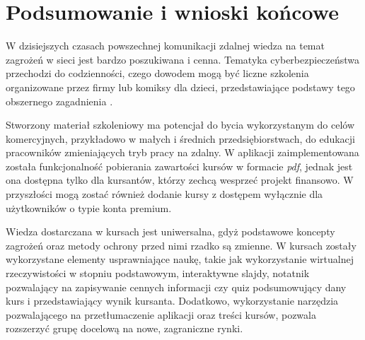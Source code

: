 \documentclass[12pt,twoside]{article}
\begin{document}
\section{Podsumowanie i wnioski końcowe}

W dzisiejszych czasach powszechnej komunikacji zdalnej wiedza na temat zagrożeń w sieci jest bardzo poszukiwana i cenna. Tematyka cyberbezpieczeństwa przechodzi do codzienności, czego dowodem mogą być liczne szkolenia organizowane przez firmy lub komiksy dla dzieci, przedstawiające podstawy tego obszernego zagadnienia \cite{Edukomiks}.


Stworzony materiał szkoleniowy ma potencjał do bycia wykorzystanym do celów komercyjnych, przykładowo w małych i średnich przedsiębiorstwach, do edukacji pracowników zmieniających tryb pracy na zdalny. W aplikacji zaimplementowana została funkcjonalność pobierania zawartości kursów w formacie \emph{pdf}, jednak jest ona dostępna tylko dla kursantów, którzy zechcą wesprzeć projekt finansowo. W przyszłości mogą zostać również dodanie kursy z dostępem wyłącznie dla użytkowników o typie konta premium. 

Wiedza dostarczana w kursach jest uniwersalna, gdyż podstawowe koncepty zagrożeń oraz metody ochrony przed nimi rzadko są zmienne. W kursach zostały wykorzystane elementy usprawniające naukę, takie jak wykorzystanie wirtualnej rzeczywistości w stopniu podstawowym, interaktywne slajdy, notatnik pozwalający na zapisywanie cennych informacji czy quiz podsumowujący dany kurs i przedstawiający wynik kursanta. Dodatkowo, wykorzystanie narzędzia pozwalającego na przetłumaczenie aplikacji oraz treści kursów, pozwala rozszerzyć grupę docelową na nowe, zagraniczne rynki.
\end{document}
